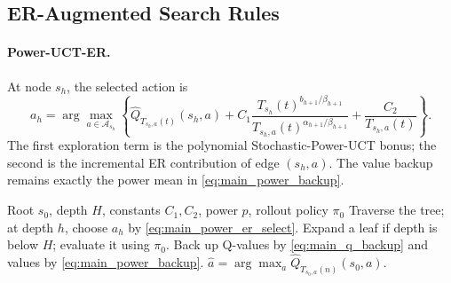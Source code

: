 \documentclass{article}
\newcommand{\Qhat}{\widehat{Q}}
\begin{document}
\subsection{ER-Augmented Search Rules}
\label{sec:main_algorithms}
\paragraph{Power-UCT-ER.}
At node $s_h$, the selected action is
\begin{equation}
 a_h=\arg\max_{a\in\mathcal{A}_{s_h}}\left\{\Qhat_{T_{s_h,a}(t)}(s_h,a)+C_1\frac{T_{s_h}(t)^{b_{h+1}/\beta_{h+1}}}{T_{s_h,a}(t)^{\alpha_{h+1}/\beta_{h+1}}}+\frac{C_2}{T_{s_h,a}(t)}\right\}.
\label{eq:main_power_er_select}
\end{equation}
The first exploration term is the polynomial Stochastic-Power-UCT bonus; the second is the incremental ER contribution of edge $(s_h,a)$.  The value backup remains exactly the power mean in \eqref{eq:main_power_backup}.

\begin{algorithm}[t]
\caption{MCTS-ER main selection rule}
\label{alg:mcts-er-main}
\begin{algorithmic}[1]
\REQUIRE Root $s_0$, depth $H$, constants $C_1,C_2$, power $p$, rollout policy $\pi_0$
    \STATE Traverse the tree; at depth $h$, choose $a_h$ by \eqref{eq:main_power_er_select}.
    \STATE Expand a leaf if depth is below $H$; evaluate it using $\pi_0$.
    \STATE Back up Q-values by \eqref{eq:main_q_backup} and values by \eqref{eq:main_power_backup}.
\ENDFOR
\RETURN $\hat a=\arg\max_a\Qhat_{T_{s_0,a}(n)}(s_0,a)$.
\end{algorithmic}
\end{algorithm}
\end{document}
